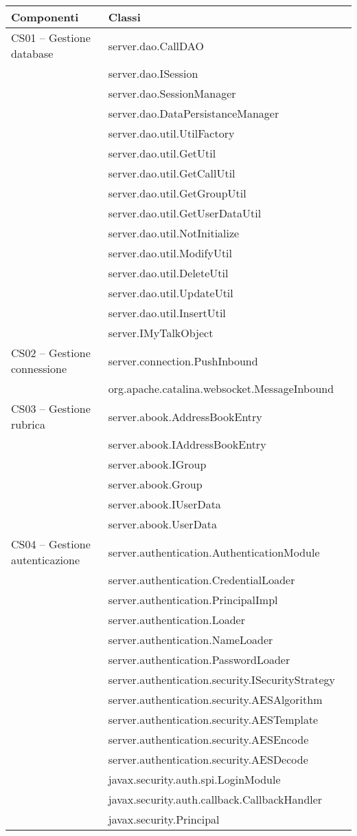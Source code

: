 \begin{center}
\begin{longtable}{lp{}l}
\toprule Componenti & Classi\\
\midrule
CS01 -- Gestione database
& server.dao.CallDAO\\
& server.dao.ISession\\
& server.dao.SessionManager\\
& server.dao.DataPersistanceManager\\
& server.dao.util.UtilFactory\\
& server.dao.util.GetUtil\\
& server.dao.util.GetCallUtil\\
& server.dao.util.GetGroupUtil\\
& server.dao.util.GetUserDataUtil\\
& server.dao.util.NotInitialize\\
& server.dao.util.ModifyUtil\\
& server.dao.util.DeleteUtil\\
& server.dao.util.UpdateUtil\\
& server.dao.util.InsertUtil\\
& server.IMyTalkObject\\

CS02 -- Gestione connessione & server.connection.PushInbound\\
& org.apache.catalina.websocket.MessageInbound\\

CS03 -- Gestione rubrica & server.abook.AddressBookEntry\\
& server.abook.IAddressBookEntry\\
& server.abook.IGroup\\
& server.abook.Group\\
& server.abook.IUserData\\
& server.abook.UserData\\

CS04 -- Gestione autenticazione & server.authentication.AuthenticationModule\\
& server.authentication.CredentialLoader\\
& server.authentication.PrincipalImpl\\
& server.authentication.Loader\\
& server.authentication.NameLoader\\
& server.authentication.PasswordLoader\\
& server.authentication.security.ISecurityStrategy\\
& server.authentication.security.AESAlgorithm\\
& server.authentication.security.AESTemplate\\
& server.authentication.security.AESEncode\\
& server.authentication.security.AESDecode\\
& javax.security.auth.spi.LoginModule\\
& javax.security.auth.callback.CallbackHandler\\
& javax.security.Principal\\


\end{longtable}
\end{center}
